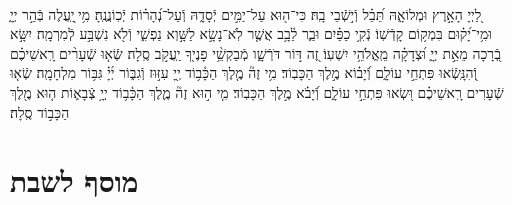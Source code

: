 \documentclass[twoside, openany, parskip=half, 11pt]{book}
\begin{document}
\begin{sometimes}

\\
%
לַ֭יְיָ הָאָ֣רֶץ וּמְלוֹאָ֑הּ תֵּ֝בֵ֗ל וְֿי֣שְֿׁבֵי בָֽהּ׃
כִּי־ה֖וּא עַל־יַמִּ֣ים יְֿסָדָ֑הּ וְֿעַל־נְ֝הָר֗וֹת יְֿכֽוֹנֲנֶֽהָ׃
מִ֥י ֖יַֽעֲלֶה בְּֿהַ֣ר יְיָ֑ וּמִ֥י־יָ֝ק֗וּם בִּמְק֥וֹם קָדְֿשֽׁוֹ׃
נְֿקִ֥י כַפַּ֗יִם וּבַ֢ר לֵ֫בָ֥ב אֲשֶׁ֤ר לֹֽא־נָשָׂ֣א לַשָּׁ֣וְא נַפְשִׁ֑י וְֿלֹ֖א נִשְׁבַּ֣ע לְֿמִרְמָֽה׃
יִשָּׂ֣א בְֿ֭רָכָה מֵאֵ֣ת יְיָ֑ וּ֝צְדָקָ֗ה מֵֽאֱלֹהֵ֥י יִשְׁעֽוֹ׃
זֶ֭ה דּ֣וֹר דֹּרְֿשָׁ֑ו מְֿבַקְשֵׁ֥֨י פָנֶי֖ךָ יַֽעֲקֹ֣ב סֶֽלָה׃
שְֿׂא֤וּ שְֿׁעָרִ֨ים רָֽאשֵׁיכֶ֗ם וְֿ֭הִנָּֽשְֿׂאוּ פִּתְחֵ֣י עוֹלָ֑ם וְֿ֝יָב֗וֹא מֶ֣לֶךְ הַכָּבֽוֹד׃
מִ֥י זֶה֘ מֶ֤לֶךְ הַכָּ֫ב֥וֹד יְ֖יָ עִזּ֣וּז וְֿגִבּ֑וֹר יְ֜יָ֗ גִּבּ֥וֹר מִלְחָמָֽה׃
שְֿׂא֤וּ שְֿׁעָרִים רָֽאשֵׁיכֶ֗ם וּ֭שְׂאוּ פִּתְחֵ֣י עוֹלָ֑ם וְֿ֝יָבֹ֗א מֶ֣לֶךְ הַכָּבֽוֹד׃
מִ֤י ה֣וּא זֶה֘ מֶ֢לֶךְ הַכָּ֫ב֥וֹד יְיָ֥ צְֿבָא֑וֹת ה֤וּא מֶ֖לֶךְ הַכָּב֣וֹד סֶֽלָה׃

\end{sometimes}



\etzchaim

\halfkaddish


\vspace{\baselineskip}


{\let\clearpage\relax
\chapter[מוסף לשבת]{ מוסף לשבת }}

\amidaopening{\shabbosshuva}{}

\end{document}
